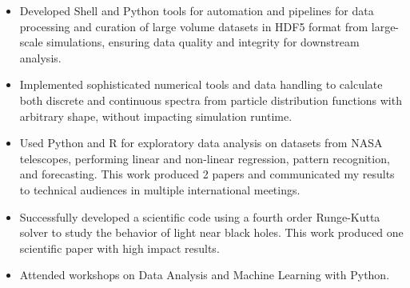 {%
\begin{itemize}
    \item Developed Shell and Python tools for automation and pipelines for data processing and curation of large volume datasets in HDF5 format from large-scale simulations, ensuring data quality and integrity for downstream analysis.
    \item Implemented sophisticated numerical tools and data handling to calculate both discrete and continuous spectra from particle distribution functions with arbitrary shape, without impacting simulation runtime.
    \item Used Python and R for exploratory data analysis on datasets from NASA telescopes, performing linear and non-linear regression, pattern recognition, and forecasting. This work produced 2 papers and communicated my results to technical audiences in multiple international meetings.
    \item Successfully developed a scientific code using a fourth order Runge-Kutta solver to study the behavior of light near black holes. This work produced one scientific paper with high impact results.
    \item Attended workshops on Data Analysis and Machine Learning with Python.
\end{itemize}
}
